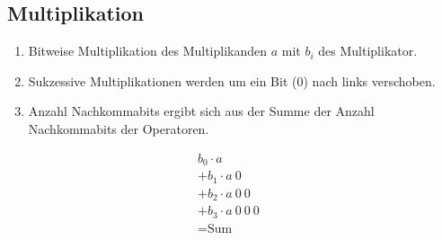 \subsection{Multiplikation}
\begin{center}
    \begin{minipage}[t]{0.70\linewidth}
        \begin{enumerate}
            \item Bitweise Multiplikation des Multiplikanden $a$ mit $b_i$ des Multiplikator.
            \item Sukzessive Multiplikationen werden um ein Bit ($0$) nach links verschoben.
            \item Anzahl Nachkommabits ergibt sich aus der Summe der Anzahl Nachkommabits der Operatoren.
        \end{enumerate}
    \end{minipage}
    \hfill
    \begin{minipage}[t]{0.25\linewidth}
        \begin{align*}
            b_0 \cdot a&\\
            +b_1 \cdot a~0\\
            +b_2 \cdot a~0~0&\\
            +b_3 \cdot a~0~0~0&\\
            \hline
            =\text{Sum}&
        \end{align*}
    \end{minipage}
\end{center}
